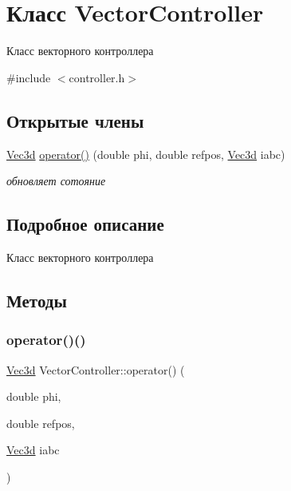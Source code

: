 \hypertarget{classVectorController}{}\section{Класс Vector\+Controller}
\label{classVectorController}


Класс векторного контроллера  




{\ttfamily \#include $<$controller.\+h$>$}

\subsection*{Открытые члены}
\begin{DoxyCompactItemize}
\item 
\hyperlink{structVec3}{Vec3d} \hyperlink{classVectorController_a1ec5293a94bd834736e5c6fbf293dbb8}{operator()} (double phi, double refpos, \hyperlink{structVec3}{Vec3d} iabc)
\begin{DoxyCompactList}\small\item\em обновляет сотояние \end{DoxyCompactList}\end{DoxyCompactItemize}


\subsection{Подробное описание}
Класс векторного контроллера 

\subsection{Методы}
\mbox{\label{classVectorController_a1ec5293a94bd834736e5c6fbf293dbb8}} 
\subsubsection{\texorpdfstring{operator()()}{operator()()}}
{\footnotesize\ttfamily \hyperlink{structVec3}{Vec3d} Vector\+Controller\+::operator() (\begin{DoxyParamCaption}\item[{double}]{phi,  }\item[{double}]{refpos,  }\item[{\hyperlink{structVec3}{Vec3d}}]{iabc }\end{DoxyParamCaption})\hspace{0.3cm}{\ttfamily [inline]}}



